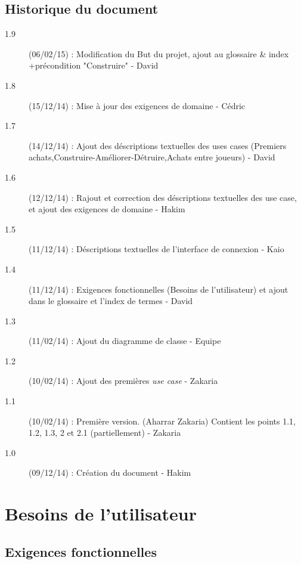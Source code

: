 \documentclass[a4paper,11pt]{report}
\begin{document}
\section{Historique du document}
\begin{description}
	\item[1.9] (06/02/15) : Modification du But du projet, ajout au glossaire \& index +précondition "Construire"  - David
	\item[1.8] (15/12/14) : Mise à jour des exigences de domaine - Cédric
    \item[1.7] (14/12/14) : Ajout des déscriptions textuelles des uses cases (Premiers achats,Construire-Améliorer-Détruire,Achats entre joueurs) - David
    \item[1.6] (12/12/14) : Rajout et correction des déscriptions textuelles des use case, et ajout des exigences de domaine - Hakim
    \item[1.5] (11/12/14) : Déscriptions textuelles de l'interface de connexion - Kaio
    \item[1.4] (11/12/14) : Exigences fonctionnelles (Besoins de l'utilisateur) et ajout dans le glossaire et l'index de termes - David
    \item[1.3] (11/02/14) : Ajout du diagramme de classe - Equipe
    \item[1.2] (10/02/14) : Ajout des premières \textit{use case} - Zakaria
    \item[1.1] (10/02/14) : Première version. (Aharrar Zakaria) Contient les points 1.1, 1.2, 1.3, 2 et 2.1 (partiellement) - Zakaria
    \item[1.0] (09/12/14) : Création du document - Hakim
    
\end{description}


\newpage
\chapter{Besoins de l'utilisateur}
\section{Exigences fonctionnelles}
\end{document}
